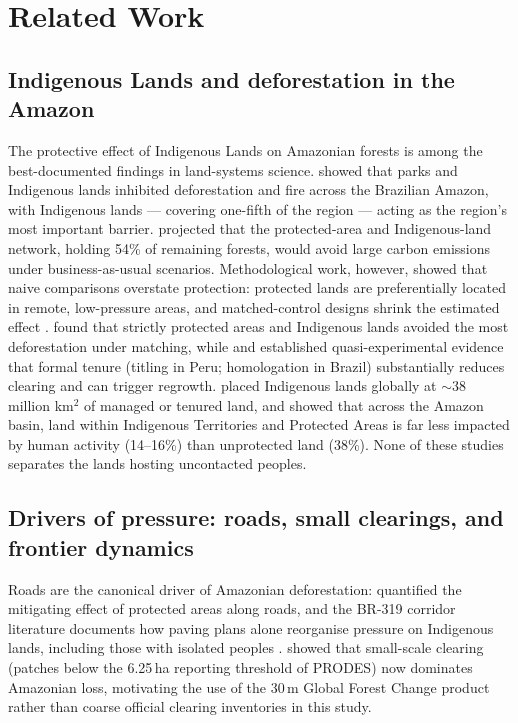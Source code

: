 \section{Related Work}\label{sec:related}

\subsection{Indigenous Lands and deforestation in the Amazon}
The protective effect of Indigenous Lands on Amazonian forests is among the best-documented findings in land-systems science. \citet{nepstad2006} showed that parks and Indigenous lands inhibited deforestation and fire across the Brazilian Amazon, with Indigenous lands --- covering one-fifth of the region --- acting as the region's most important barrier. \citet{soaresfilho2010} projected that the protected-area and Indigenous-land network, holding 54\% of remaining forests, would avoid large carbon emissions under business-as-usual scenarios. Methodological work, however, showed that naive comparisons overstate protection: protected lands are preferentially located in remote, low-pressure areas, and matched-control designs shrink the estimated effect \citep{andam2008,joppa2010}. \citet{nolte2013} found that strictly protected areas and Indigenous lands avoided the most deforestation under matching, while \citet{blackman2017} and \citet{baragwanath2020,baragwanath2023} established quasi-experimental evidence that formal tenure (titling in Peru; homologation in Brazil) substantially reduces clearing and can trigger regrowth. \citet{garnett2018} placed Indigenous lands globally at $\sim$38 million km$^2$ of managed or tenured land, and \citet{ritter2025} showed that across the Amazon basin, land within Indigenous Territories and Protected Areas is far less impacted by human activity (14--16\%) than unprotected land (38\%). None of these studies separates the lands hosting uncontacted peoples.

\subsection{Drivers of pressure: roads, small clearings, and frontier dynamics}
Roads are the canonical driver of Amazonian deforestation: \citet{barber2014} quantified the mitigating effect of protected areas along roads, and the BR-319 corridor literature documents how paving plans alone reorganise pressure on Indigenous lands, including those with isolated peoples \citep{ferrante2020,andrade2021}. \citet{kalamandeen2018} showed that small-scale clearing (patches below the 6.25\,ha reporting threshold of PRODES) now dominates Amazonian loss, motivating the use of the 30\,m Global Forest Change product rather than coarse official clearing inventories in this study.

